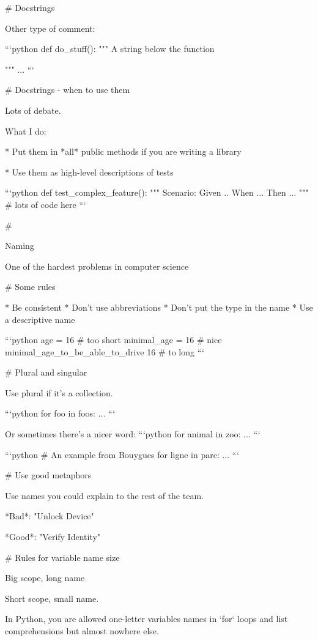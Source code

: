 # Docstrings

Other type of comment:

```python
def do_stuff():
    """ A string below the function

    """
    ...
```

# Docstrings - when to use them

Lots of debate.

What I do:

* Put them in *all* public methods if you are writing a library

* Use them as high-level descriptions of tests

```python
def test_complex_feature():
    """ Scenario:
    Given ..
    When ...
    Then ...
    """
    # lots of code here
```

#

\huge \center Naming

\vfill

\normalsize One of the hardest problems in computer science

# Some rules

* Be consistent
* Don't use abbreviations
* Don't put the type in the name
* Use a descriptive name

\vfill

```python
age = 16  # too short
minimal_age = 16 # nice
minimal_age_to_be_able_to_drive  16  # to long
```

# Plural and singular

Use plural if it's a collection.

```python
for foo in foos:
    ...
```

Or sometimes there's a nicer word:
```python
for animal in zoo:
    ...
```

```python
# An example from Bouygues
for ligne in parc:
  ...
```

# Use good metaphors

Use names you could explain to the rest of the team.

\vfill

*Bad*: "Unlock Device"

*Good*: "Verify Identity"

# Rules for variable name size

Big scope, long name

Short scope, small name.

In Python, you are allowed one-letter variables names in `for` loops
and list comprehensions but almost nowhere else.

